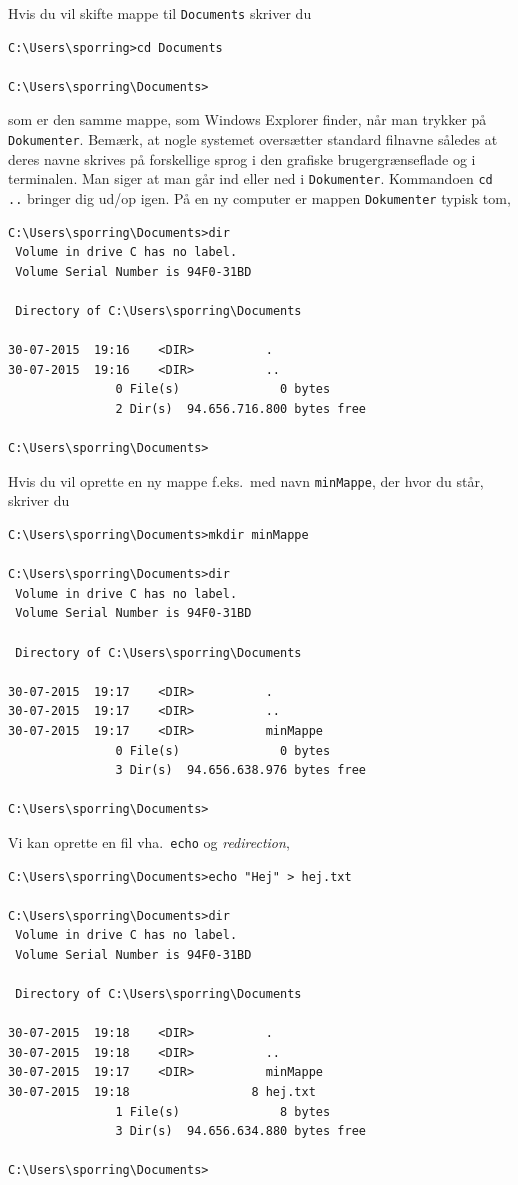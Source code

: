 \documentclass[a4paper]{article}
\begin{document}
Hvis du vil skifte mappe til \verb|Documents| skriver du
\begin{lstlisting}[frame=single]
C:\Users\sporring>cd Documents

C:\Users\sporring\Documents>
\end{lstlisting}
som er den samme mappe, som Windows Explorer finder, når man trykker på \verb|Dokumenter|.  Bemærk, at nogle systemet oversætter standard filnavne således at deres navne skrives på forskellige sprog i den grafiske brugergrænseflade og i terminalen. Man siger at man går ind eller ned i \verb|Dokumenter|. Kommandoen \verb|cd ..| bringer dig ud/op igen. På en ny computer er mappen \verb|Dokumenter| typisk tom,
\begin{lstlisting}[frame=single]
C:\Users\sporring\Documents>dir
 Volume in drive C has no label.
 Volume Serial Number is 94F0-31BD

 Directory of C:\Users\sporring\Documents

30-07-2015  19:16    <DIR>          .
30-07-2015  19:16    <DIR>          ..
               0 File(s)              0 bytes
               2 Dir(s)  94.656.716.800 bytes free

C:\Users\sporring\Documents>
\end{lstlisting}
Hvis du vil oprette en ny mappe f.eks.\ med navn \verb|minMappe|, der hvor du står, skriver du
\begin{lstlisting}[frame=single]
C:\Users\sporring\Documents>mkdir minMappe

C:\Users\sporring\Documents>dir
 Volume in drive C has no label.
 Volume Serial Number is 94F0-31BD

 Directory of C:\Users\sporring\Documents

30-07-2015  19:17    <DIR>          .
30-07-2015  19:17    <DIR>          ..
30-07-2015  19:17    <DIR>          minMappe
               0 File(s)              0 bytes
               3 Dir(s)  94.656.638.976 bytes free

C:\Users\sporring\Documents>
\end{lstlisting}
Vi kan oprette en fil vha.\ \verb|echo| og \textit{redirection},
\begin{lstlisting}[frame=single]
C:\Users\sporring\Documents>echo "Hej" > hej.txt

C:\Users\sporring\Documents>dir
 Volume in drive C has no label.
 Volume Serial Number is 94F0-31BD

 Directory of C:\Users\sporring\Documents

30-07-2015  19:18    <DIR>          .
30-07-2015  19:18    <DIR>          ..
30-07-2015  19:17    <DIR>          minMappe
30-07-2015  19:18                 8 hej.txt
               1 File(s)              8 bytes
               3 Dir(s)  94.656.634.880 bytes free

C:\Users\sporring\Documents>
\end{lstlisting}
\end{document}
